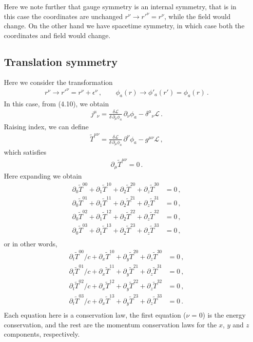 \documentclass[11pt, onesided]{book}
\theoremstyle{break}
\theoremstyle{break}
\newcommand{\pd}{\partial}
\newcommand{\that}[1]{\widetilde{#1}}
\begin{document}
Here we note further that gauge symmetry is an internal symmetry, that is in this case the coordinates are unchanged $r^\nu \to r'^\nu = r^\nu$, while the field would change. On the other hand we have spacetime symmetry, in which case both the coordinates and field would change.\\

\subsection*{Translation symmetry}
Here we consider the transformation
\begin{align*}
r^\nu \to r'^\nu = r^\nu + \epsilon^\nu\,,\qquad
\phi_a(r) \to \phi'_a(r') = \phi_a(r)\,.
\end{align*}
In this case, from (4.10), we obtain
\begin{align*}
j^\mu{}_\nu = \frac{\delta \mathcal{L}}{\delta\, \pd_\mu \phi_a} \, \pd_\nu \phi_a - \delta^\mu{}_\nu \mathcal{L}\,.
\end{align*}
Raising index, we can define
\begin{align*}
\that{T}^{\mu\nu} = 
\frac{\delta \mathcal{L}}{\delta\, \pd_\mu \phi_a} \, \pd^\nu \phi_a - g^{\mu\nu} \mathcal{L}\,,
\end{align*}
which satisfies
\begin{align*}
\pd_\mu \that{T}^{\mu\nu} = 0\,.
\end{align*}
Here expanding we obtain
\begin{align*}
\pd_0 \that{T}^{00} + \pd_1 \that{T}^{10} + \pd_2 \that{T}^{20} + \pd_z \that{T}^{30} &= 0\,,\\
\pd_0 \that{T}^{01} + \pd_1 \that{T}^{11} + \pd_2 \that{T}^{21} + \pd_z \that{T}^{31} &= 0\,,\\
\pd_0 \that{T}^{02} + \pd_1 \that{T}^{12} + \pd_2 \that{T}^{22} + \pd_z \that{T}^{32} &= 0\,,\\
\pd_0 \that{T}^{03} + \pd_1 \that{T}^{13} + \pd_2 \that{T}^{23} + \pd_z \that{T}^{33} &= 0\,,\\
\end{align*}
or in other words,
\begin{align*}
\pd_t \that{T}^{00} /c+ \pd_x \that{T}^{10} + \pd_y \that{T}^{20} + \pd_z \that{T}^{30} &= 0\,,\\
\pd_t \that{T}^{01} /c+ \pd_x \that{T}^{11} + \pd_y \that{T}^{21} + \pd_z \that{T}^{31} &= 0\,,\\
\pd_t \that{T}^{02} /c+ \pd_x \that{T}^{12} + \pd_y \that{T}^{22} + \pd_z \that{T}^{32} &= 0\,,\\
\pd_t \that{T}^{03} /c+ \pd_x \that{T}^{13} + \pd_y \that{T}^{23} + \pd_z \that{T}^{33} &= 0\,.\\
\end{align*}
Each equation here is a conservation law, the first equation ($\nu$ = 0) is the energy conservation, and the rest are the momentum conservation laws for the $x$, $y$ and $z$ components, respectively.\\
\end{document}
